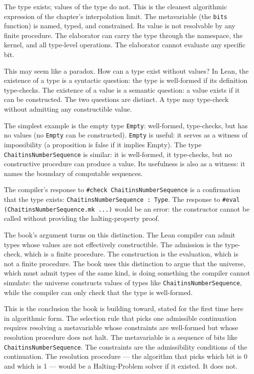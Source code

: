 The type exists; values of the type do not. This is the cleanest
algorithmic expression of the chapter's interpolation limit. The
metavariable (the \texttt{bits} function) is named, typed, and
constrained. Its value is not resolvable by any finite procedure. The
elaborator can carry the type through the namespace, the kernel, and
all type-level operations. The elaborator cannot evaluate any specific
bit.

This may seem like a paradox. How can a type exist without values? In
Lean, the existence of a type is a syntactic question: the type is
well-formed if its definition type-checks. The existence of a value is
a semantic question: a value exists if it can be constructed. The two
questions are distinct. A type may type-check without admitting any
constructible value.

The simplest example is the empty type \texttt{Empty}: well-formed,
type-checks, but has no values (no \texttt{Empty} can be constructed).
\texttt{Empty} is useful: it serves as a witness of impossibility (a
proposition is false if it implies $\text{Empty}$). The type
\texttt{ChaitinsNumberSequence} is similar: it is well-formed, it
type-checks, but no constructive procedure can produce a value. Its
usefulness is also as a witness: it names the boundary of computable
sequences.

The compiler's response to \texttt{\#check
ChaitinsNumberSequence} is a confirmation that the type exists:
\texttt{ChaitinsNumberSequence : Type}. The response to \texttt{\#eval
(ChaitinsNumberSequence.mk ...)} would be an error: the constructor
cannot be called without providing the halting-property proof.

The book's argument turns on this distinction. The Lean compiler can
admit types whose values are not effectively constructible. The
admission is the type-check, which is a finite procedure. The
construction is the evaluation, which is not a finite procedure. The
book uses this distinction to argue that the universe, which must
admit types of the same kind, is doing something the compiler cannot
simulate: the universe constructs values of types like
\texttt{ChaitinsNumberSequence}, while the compiler can only check
that the type is well-formed.

This is the conclusion the book is building toward, stated for the
first time here in algorithmic form. The selection rule that picks
one admissible continuation requires resolving a metavariable whose
constraints are well-formed but whose resolution procedure does not
halt. The metavariable is a sequence of bits like
\texttt{ChaitinsNumberSequence}. The constraints are the
admissibility conditions of the continuation. The resolution
procedure --- the algorithm that picks which bit is 0 and which is 1
--- would be a Halting-Problem solver if it existed. It does not.

